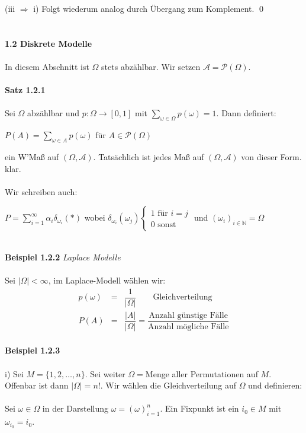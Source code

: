 \documentclass[10pt,a4paper]{report}
\numberwithin{equation}{section}
\numberwithin{figure}{section}
\theoremstyle{plain}
\theoremstyle{definition}
\theoremstyle{plain}
\theoremstyle{definition}
\theoremstyle{remark}
\theoremstyle{plain}
\begin{document}
(iii $\Rightarrow$ i) Folgt wiederum analog durch Übergang zum Komplement. \qed\\\\\\
\Large{\textbf{1.2 Diskrete Modelle}}\normalsize\\\\
In diesem Abschnitt ist $\Omega$ stets abzählbar. Wir setzen $\mathcal{A}=\mathcal{P}(\Omega)$.\\\\
\textbf{Satz 1.2.1}\\\\
Sei $\Omega$ abzählbar und $p: \Omega \to [0,1]$ mit $\sum\limits_{\omega \in \Omega}p(\omega)=1$. Dann definiert:
\begin{center}
$P(A)=\sum\limits_{\omega \in A} p(\omega)$ für $A\in \mathcal{P}(\Omega)$
\end{center}
ein W'Maß auf $(\Omega,\mathcal{A})$. Tatsächlich ist jedes Maß auf $(\Omega,\mathcal{A})$ von dieser Form.
\proof klar.\\\\
Wir schreiben auch:
\begin{center}
$P=\sum\limits_{i=1}^\infty \alpha_i\delta_{\omega_i}(*)$ wobei $\delta_{\omega_i}(\omega_j)
\begin{cases}
1 \text{ für } i=j\\
0 \text{ sonst}
\end{cases}$ und $(\omega_i)_{i \in \mathbb{N}}=\Omega$
\end{center}
$ $\\
\textbf{Beispiel 1.2.2} \textit{Laplace Modelle}\\\\
Sei $|\Omega|<\infty$, im Laplace-Modell wählen wir:
\begin{eqnarray*}
p(\omega)&=&\dfrac{1}{|\Omega|} \qquad \text{Gleichverteilung}\\
P(A)&=&\dfrac{|A|}{|\Omega|}=\dfrac{\text{Anzahl günstige Fälle}}{\text{Anzahl mögliche Fälle}}
\end{eqnarray*}
\\
\textbf{Beispiel 1.2.3}\\\\
i) Sei $M=\{1,2,\dots,n\}$. Sei weiter $\Omega=$Menge aller Permutationen auf $M$. Offenbar ist dann $|\Omega|=n!$. Wir wählen die Gleichverteilung auf $\Omega$ und definieren:\\\\
Sei $\omega \in \Omega$ in der Darstellung $\omega=(\omega)_{i=1}^n$. Ein Fixpunkt ist ein $i_0 \in M$ mit $\omega_{i_0}=i_0$.\\\\
\end{document}
